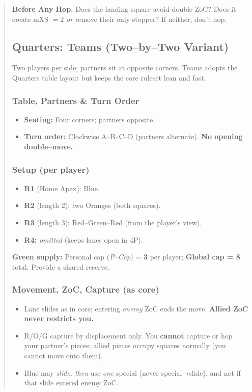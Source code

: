 \documentclass[11pt]{article}
\begin{document}
\begin{quote}
\begin{tcolorbox}[enhanced,breakable,title={Pocket Checklists (Say it before you move)},
  colback=white,colframe=royal,boxrule=0.8pt]
\textbf{Before Any Hop.} Does the landing square avoid double ZoC? Does it create mXS $=2$ \emph{or} remove their only stopper? If neither, don’t hop.
\end{tcolorbox}

\subsection{Quarters: Teams (Two–by–Two Variant)}
\label{sec:teams}

\noindent Two players per side; partners sit at opposite corners. Teams adopts the Quarters table layout but keeps the core ruleset lean and fast.

\subsubsection*{Table, Partners \& Turn Order}
\begin{itemize}[leftmargin=1.3em,itemsep=0.25em]
  \item \textbf{Seating:} Four corners; partners opposite.
  \item \textbf{Turn order:} Clockwise A–B–C–D (partners alternate). \textbf{No opening double–move.}
\end{itemize}

\subsubsection*{Setup (per player)}
\begin{itemize}[leftmargin=1.3em,itemsep=0.25em]
  \item \textbf{R1} (Home Apex): Blue.
  \item \textbf{R2} (length 2): two Oranges (both squares).
  \item \textbf{R3} (length 3): Red–Green–Red (from the player’s view).
  \item \textbf{R4:} \emph{omitted} (keeps lanes open in 4P).
\end{itemize}
\noindent \textbf{Green supply:} Personal cap (\emph{P–Cap}) = \textbf{3} per player; \textbf{Global cap = 8} total. Provide a shared reserve.

\subsubsection*{Movement, ZoC, Capture (as core)}
\begin{itemize}[leftmargin=1.3em,itemsep=0.2em]
  \item Lane slides as in core; entering \emph{enemy} ZoC ends the move. \textbf{Allied ZoC never restricts you.}
  \item R/O/G capture by displacement only. You \textbf{cannot} capture or hop your partner’s pieces; allied pieces occupy squares normally (you cannot move onto them).
  \item Blue may \emph{slide, then} use \emph{one} special (never special→slide), and not if that slide entered enemy ZoC.
\end{itemize}


\end{quote}
\end{document}
